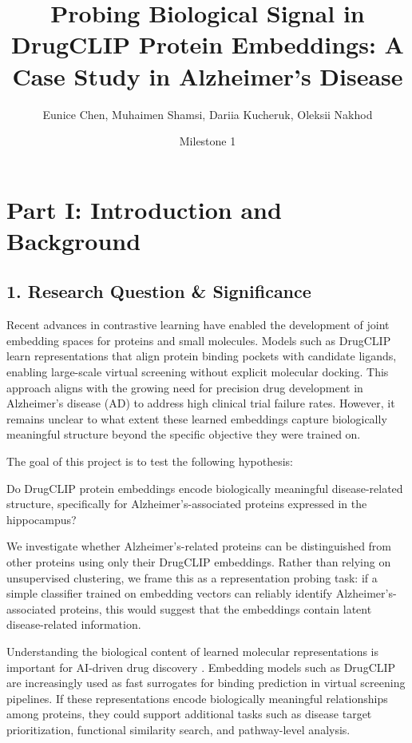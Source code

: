 \documentclass{article}
\title{Probing Biological Signal in DrugCLIP Protein Embeddings: A Case Study in Alzheimer's Disease}
\author{Eunice Chen, Muhaimen Shamsi, Dariia Kucheruk, Oleksii Nakhod}
\date{Milestone 1}
\begin{document}
\maketitle

\section*{Part I: Introduction and Background}

\subsection*{1. Research Question \& Significance}
Recent advances in contrastive learning have enabled the development of joint embedding spaces for proteins and small molecules. Models such as DrugCLIP \cite{adGwas2025,drugclipData2024} learn representations that align protein binding pockets with candidate ligands, enabling large-scale virtual screening without explicit molecular docking. This approach aligns with the growing need for precision drug development in Alzheimer's disease (AD) to address high clinical trial failure rates. However, it remains unclear to what extent these learned embeddings capture biologically meaningful structure beyond the specific objective they were trained on.

The goal of this project is to test the following hypothesis:

Do DrugCLIP protein embeddings encode biologically meaningful disease-related structure, specifically for Alzheimer's-associated proteins expressed in the hippocampus? \cite{adRegion2019,adRegion2022}

We investigate whether Alzheimer's-related proteins can be distinguished from other proteins using only their DrugCLIP embeddings. Rather than relying on unsupervised clustering, we frame this as a representation probing task: if a simple classifier trained on embedding vectors can reliably identify Alzheimer's-associated proteins, this would suggest that the embeddings contain latent disease-related information.

Understanding the biological content of learned molecular representations is important for AI-driven drug discovery \cite{adDrug2025}. Embedding models such as DrugCLIP are increasingly used as fast surrogates for binding prediction \cite{seaadPreprint2025} in virtual screening pipelines. If these representations encode biologically meaningful relationships among proteins, they could support additional tasks such as disease target prioritization, functional similarity search, and pathway-level analysis.
\end{document}
